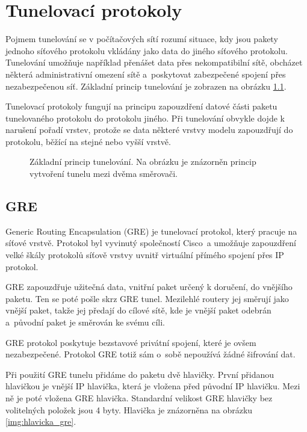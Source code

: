 \chapter{Tunelovací protokoly}
\label{chap:tunel}
Pojmem tunelování se v počítačových sítí rozumí situace, kdy jsou pakety jednoho síťového protokolu vkládány jako data do jiného síťového protokolu. Tunelování umožňuje například přenášet data přes nekompatibilní sítě, obcházet některá administrativní omezení sítě a~poskytovat zabezpečené spojení přes nezabezpečenou síť. Základní princip tunelování je zobrazen na obrázku \ref{img:tunel}.

Tunelovací protokoly fungují na principu zapouzdření datové části paketu tunelovaného protokolu do protokolu jiného. Při tunelování obvykle dojde k narušení pořadí vrstev, protože se data některé vrstvy modelu zapouzdřují do protokolu, běžící na stejné nebo vyšší vrstvě.

\begin{figure}[H]
    \centering
    \caption{Základní princip tunelování. Na obrázku je znázorněn princip vytvoření tunelu mezi dvěma směrovači.}
    \label{img:tunel}
\end{figure}

\section{GRE}
Generic Routing Encapsulation (GRE) \cite{gre} je tunelovací protokol, který pracuje na síťové vrstvě. Protokol byl vyvinutý společností Cisco~a umožňuje zapouzdření velké škály protokolů síťově vrstvy uvnitř virtuální přímého spojení přes IP protokol.

GRE zapouzdřuje užitečná data, vnitřní paket určený k doručení, do vnějšího paketu. Ten se poté pošle skrz GRE tunel. Mezilehlé routery jej směrují jako vnější paket, takže jej předají do cílové sítě, kde je vnější paket odebrán a~původní paket je směrován ke svému cíli.

GRE protokol poskytuje bezstavové privátní spojení, které je ovšem nezabezpečené. Protokol GRE totiž sám o~sobě nepoužívá žádné šifrování dat.

Při použití GRE tunelu přidáme do paketu dvě hlavičky. První přidanou hlavičkou je vnější IP hlavička, která je vložena před původní IP hlavičku. Mezi ně je poté vložena GRE hlavička. Standardní velikost GRE hlavičky bez volitelných položek jsou 4 byty. Hlavička je znázorněna na obrázku \ref{img:hlavicka_gre}.

